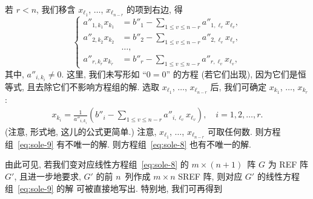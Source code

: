 \documentclass[../libro.tex]{subfiles}
\begin{document}
若 \(r < n\), 我们移含
\(x_{\ell_1}\), \(\dots\), \(x_{\ell_{n-r}}\) 的项到右边,
得
\begin{equation*}
    \left\{ %
    \begin{aligned}
        a''_{1,k_1} x_{k_1} & = b''_1 - \sum_{1 \leq v \leq n-r} {a''_{1,\ell_v} x_{\ell_v}}, \\
        a''_{2,k_2} x_{k_2} & = b''_2 - \sum_{1 \leq v \leq n-r} {a''_{2,\ell_v} x_{\ell_v}}, \\
        & \dots, \\
        a''_{r,k_r} x_{k_r} & = b''_r - \sum_{1 \leq v \leq n-r} {a''_{r,\ell_v} x_{\ell_v}},
    \end{aligned}
    \right. %
\end{equation*}
其中, \(a''_{i,k_i} \neq 0\).
这里, 我们未写形如 ``\(0 = 0\)'' 的方程 (若它们出现),
因为它们是恒等式,
且去除它们不影响方程组的解.
选取 \(x_{\ell_1}\), \(\dots\), \(x_{\ell_{n-r}}\) 后,
我们可确定 \(x_{k_1}\), \(\dots\), \(x_{k_r}\):
\begin{align*}
    x_{k_i} =
    \frac{1}{a''_{i,k_i}}
    \left(
        b''_i
        - \sum_{1 \leq v \leq n-r} {a''_{i,\ell_v} x_{\ell_v}}
    \right),
    \quad
    i = 1, 2, \dots, r.
\end{align*}
(注意, 形式地, 这儿的公式更简单.)
注意, \(x_{\ell_1}\), \(\dots\), \(x_{\ell_{n-r}}\)
可取任何数.
则方程组~\eqref{eq:sole-9} 有不唯一的解.
则方程组~\eqref{eq:sole-8} 也有不唯一的解.

由此可见,
若我们变对应线性方程组~\eqref{eq:sole-8} 的
\(m \times (n + 1)\)~阵 \(G\) 为 REF 阵 \(G'\),
且进一步地要求,
\(G'\) 的前 \(n\)~列作成 \(m \times n\) SREF 阵,
则对应 \(G'\) 的线性方程组~\eqref{eq:sole-9} 的解%
可被直接地写出.
特别地, 我们可再得到
\end{document}

